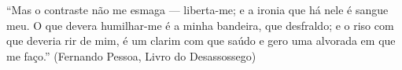 

\begin{epigrafe}
    \vspace*{\fill}
	{
		\noindent\hspace{.5\textwidth}
		{\begin{minipage}{.5\textwidth}
			\begin{flushright}
				``Mas o contraste não me esmaga — liberta-me; e a ironia que há nele é sangue meu. O que devera humilhar-me é a
				minha bandeira, que desfraldo; e o riso com que deveria rir
				de mim, é um clarim com que saúdo e gero uma alvorada em
				que me faço.'' (Fernando Pessoa, Livro do Desassossego)
			\end{flushright}
		\end{minipage}}%
		\vspace*{3cm}
	}
\end{epigrafe}
